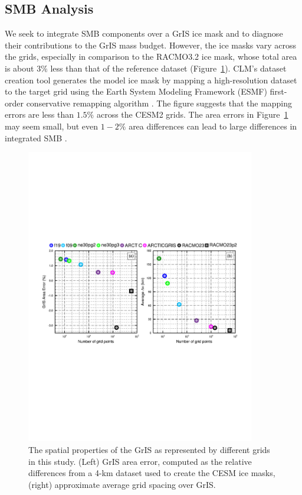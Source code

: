 \documentclass[draft]{agujournal2019}
\begin{document}
\subsection{SMB Analysis}\label{sec:SMB}

We seek to integrate SMB components over a GrIS ice mask and to diagnose their contributions to the GrIS mass budget. However, the ice masks vary across the grids, especially in comparison to the RACMO3.2 ice mask, whose total area is about $3\%$ less than that of the reference dataset (Figure~\ref{fig:grisdx}). CLM's dataset creation tool generates the model ice mask by mapping a high-resolution dataset to the target grid using the Earth System Modeling Framework (ESMF) first-order conservative remapping algorithm \cite{ESMF}. The figure suggests that the mapping errors are less than $1.5\%$ across the CESM2 grids. The area errors in Figure~\ref{fig:grisdx} may  seem small, but even $1-2\%$ area differences can lead to large differences in integrated SMB \cite{HETAL2022TC}. 

\begin{figure}[t]
\begin{center}
         \includegraphics[width=100mm]{figs/temp_grisres.pdf}
\end{center}
\caption{The spatial properties of the GrIS as represented by different grids in this study. (Left) GrIS area error, computed as the relative differences from a 4-km dataset used to create the CESM ice masks, (right) approximate average grid spacing over GrIS.}
\label{fig:grisdx}
\end{figure}
\end{document}
